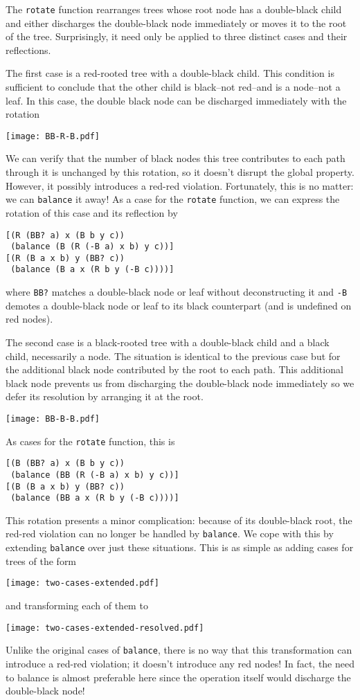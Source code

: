 \documentclass[preprint]{sigplanconf}
\begin{document}
The \texttt{rotate} function rearranges trees whose root node has a double-black child and either discharges the double-black node immediately or moves it to the root of the tree. Surprisingly, it need only be applied to three distinct cases and their reflections.

The first case is a red-rooted tree with a double-black child. This condition is sufficient to conclude that the other child is black--not red--and is a node--not a leaf. In this case, the double black node can be discharged immediately with the rotation
\begin{center}
\texttt{[image: BB-R-B.pdf]}
\end{center}
We can verify that the number of black nodes this tree contributes to each path through it is unchanged by this rotation, so it doesn't disrupt the global property. However, it possibly introduces a red-red violation. Fortunately, this is no matter: we can \texttt{balance} it away! As a case for the \texttt{rotate} function, we can express the rotation of this case and its reflection by
\begin{verbatim}
[(R (BB? a) x (B b y c))
 (balance (B (R (-B a) x b) y c))]
[(R (B a x b) y (BB? c))
 (balance (B a x (R b y (-B c))))]
\end{verbatim}
where \texttt{BB?} matches a double-black node or leaf without deconstructing it and \texttt{-B} demotes a double-black node or leaf to its black counterpart (and is undefined on red nodes).

The second case is a black-rooted tree with a double-black child and a black child, necessarily a node. The situation is identical to the previous case but for the additional black node contributed by the root to each path. This additional black node prevents us from discharging the double-black node immediately so we defer its resolution by arranging it at the root.
\begin{center}
\texttt{[image: BB-B-B.pdf]}
\end{center}
As cases for the \texttt{rotate} function, this is
\begin{verbatim}
[(B (BB? a) x (B b y c))
 (balance (BB (R (-B a) x b) y c))]
[(B (B a x b) y (BB? c))
 (balance (BB a x (R b y (-B c))))]
\end{verbatim}
This rotation presents a minor complication: because of its double-black root, the red-red violation can no longer be handled by \texttt{balance}. We cope with this by extending \texttt{balance} over just these situations. This is as simple as adding cases for trees of the form
\begin{center}
\texttt{[image: two-cases-extended.pdf]}
\end{center}
and transforming each of them to
\begin{center}
\texttt{[image: two-cases-extended-resolved.pdf]}
\end{center}
Unlike the original cases of \texttt{balance}, there is no way that this transformation can introduce a red-red violation; it doesn't introduce any red nodes! In fact, the need to balance is almost preferable here since the operation itself would discharge the double-black node!
\end{document}
